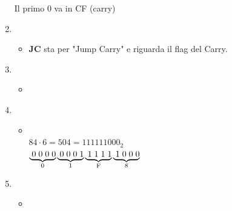 \begin{enumerate}
	\textsf{{\small Il primo 0 va in CF (carry)}} \\
	\item {} \\
	\begin{itemize}
		\item \textsf{{\small \textbf{JC} sta per "Jump Carry" e riguarda il flag del Carry.}} \\
	\end{itemize}
	\item {} \\
	\begin{itemize}
		\item {} \\
	\end{itemize}
	\item {} \\
	\begin{itemize}
		\item {} \\
		$ 84 \cdot 6 = 504 = 111111000_2 $ \\
		 $ \underbrace{\hspace{.1cm}0\hspace{.1cm}0\hspace{.1cm}0\hspace{.1cm}0} _{0} \underbrace{\hspace{.1cm}0\hspace{.1cm}0\hspace{.1cm}0\hspace{.1cm}1} _{1} \underbrace{\hspace{.1cm}1\hspace{.1cm}1\hspace{.1cm}1\hspace{.1cm}1} _{\text{F}} \underbrace{\hspace{.1cm}1\hspace{.1cm}0\hspace{.1cm}0\hspace{.1cm}0} _{8} $
	\end{itemize}
	\item {} \\
	\begin{itemize}
		\item {} \\
	\end{itemize}
\end{enumerate}

